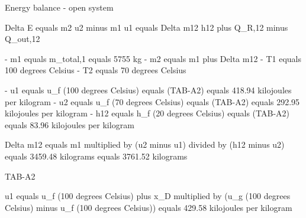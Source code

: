 Energy balance - open system  

Delta E equals m2 u2 minus m1 u1 equals Delta m12 h12 plus Q_R,12 minus Q_out,12  

- m1 equals m_total,1 equals 5755 kg  
- m2 equals m1 plus Delta m12  
- T1 equals 100 degrees Celsius  
- T2 equals 70 degrees Celsius  

- u1 equals u_f (100 degrees Celsius) equals (TAB-A2) equals 418.94 kilojoules per kilogram  
- u2 equals u_f (70 degrees Celsius) equals (TAB-A2) equals 292.95 kilojoules per kilogram  
- h12 equals h_f (20 degrees Celsius) equals (TAB-A2) equals 83.96 kilojoules per kilogram  

Delta m12 equals m1 multiplied by (u2 minus u1) divided by (h12 minus u2) equals 3459.48 kilograms equals 3761.52 kilograms  

TAB-A2  

u1 equals u_f (100 degrees Celsius) plus x_D multiplied by (u_g (100 degrees Celsius) minus u_f (100 degrees Celsius)) equals 429.58 kilojoules per kilogram